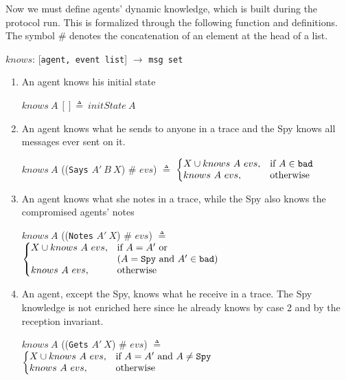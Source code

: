 Now we must define agents' dynamic knowledge, which is built during the protocol run. This is formalized through the following function and definitions. The symbol \#  denotes the concatenation of an element at the head of a list.
%
\begin{center}
  \(knows\): [\texttt{agent, event list}] \(\longrightarrow \) \texttt{msg set}
\end{center}
%
\begin{enumerate}
  \item An agent knows his initial state
  \begin{center}
    \(knows\ A\ [] \triangleq\ initState\ A\)
  \end{center}
  \item An agent knows what he sends to anyone in a trace and the Spy knows all messages ever sent on it.
  \begin{center}
    \(knows\ A\) ((\texttt{Says} \(A'\ B \ X\)) \# \(evs\)) \(\triangleq \)
    \(\left \{
      \begin{array}{@{}ll@{}}
        {X} \cup knows\ A\ evs, & \text{if } A \in \texttt{bad} \\
        knows\ A\ evs, & \text{otherwise}
      \end{array} \right.\)
  \end{center}
  \item An agent knows what she notes in a trace, while the Spy also knows the compromised agents' notes
  \begin{center}
    \(knows\ A\) ((\texttt{Notes} \(A'\ X\)) \# \(evs\)) \(\triangleq \)
    \(\left \{
      \begin{array}{@{}ll@{}}
        {X} \cup knows\ A\ evs, & \text{if } A = A' \text{ or } \\ & (A = \texttt{Spy} \text{ and } A' \in \texttt{bad}) \\
        knows\ A\ evs, & \text{otherwise}
      \end{array} \right.\)
  \end{center}
  \item An agent, except the Spy, knows what he receive in a trace. The Spy knowledge is not enriched here since he already knows by case 2 and by the reception invariant.
  \begin{center}
    \(knows\ A\) ((\texttt{Gets} \(A'\ X\)) \# \(evs\)) \(\triangleq \)
    \(\left \{
      \begin{array}{@{}ll@{}}
        {X} \cup knows\ A\ evs, & \text{if } A = A' \text{ and } A \neq \texttt{Spy} \\
        knows\ A\ evs, & \text{otherwise}
      \end{array} \right.\)
  \end{center}
\end{enumerate}

